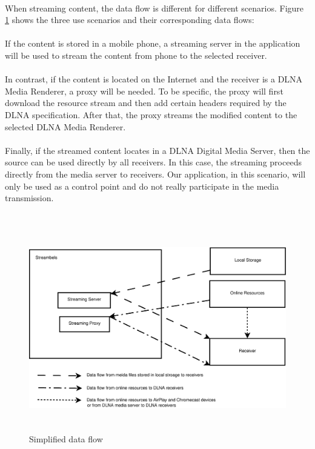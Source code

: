 \\
When streaming content, the data flow is different for different scenarios. Figure \ref{chart4} shows the three use scenarios and their corresponding data flows:\\
\\ 
If the content is stored in a mobile phone, a streaming server in the application will be used to stream the content from phone to the selected receiver.\\
\\
In contrast, if the content is located on the Internet and the receiver is a DLNA Media Renderer, a proxy will be needed. To be specific, the proxy will first download the resource stream and then add certain headers required by the DLNA specification. After that, the proxy streams the modified content to the selected DLNA Media Renderer.\\
\\
Finally, if the streamed content locates in a DLNA Digital Media Server, then the source can be used directly by all receivers. In this case, the streaming proceeds directly from the media server to receivers. Our application, in this scenario, will only be used as a control point and do not really participate in the media transmission.\\
\\
\begin{figure}[htb]
\centering \includegraphics[height=9cm]{charts/data_flow}
\caption{Simplified data flow \label{chart4}}
\end{figure}

